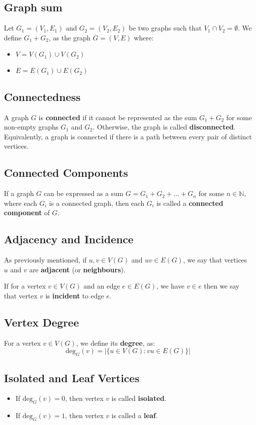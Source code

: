 \documentclass[docmute]{article}
\begin{document}
\subsection*{Graph sum}
Let \(G_1 = (V_1, E_1)\) and \(G_2 = (V_2, E_2)\) be two graphs such that  \(V_1 \cap V_2 = \emptyset\). We define \(G_1 + G_2\), as the graph \(G = (V,E)\) where:
\begin{itemize}
    \item \(V = V(G_1) \cup V(G_2)\)
    \item \(E = E(G_1) \cup E(G_2)\)
\end{itemize}

\subsection*{Connectedness}
A graph \(G\) is \textbf{connected} if it cannot be represented as the sum \(G_1 + G_2\) for some non-empty graphs \(G_1\) and \(G_2\). Otherwise, the graph is called \textbf{disconnected}.
Equivalently, a graph is connected if there is a path between every pair of distinct vertices.

\subsection*{Connected Components}
If a graph \(G\) can be expressed as a sum \(G = G_1 + G_2 + \dots + G_n\) for some \(n \in \mathbb{N}\), where each \(G_i\) is a connected graph, then each \(G_i\) is called a \textbf{connected component} of \(G\).

\subsection*{Adjacency and Incidence}
As previously mentioned, if \(u,v \in V(G)\) and \(uv \in E(G)\), we say that vertices \(u\) and \(v\) are \textbf{adjacent} (or \textbf{neighbours}).

If for a vertex \(v \in V(G)\) and an edge \(e \in E(G)\), we have \(v \in e\) then we say that vertex \(v\) is \textbf{incident} to edge \(e\).

\subsection*{Vertex Degree}
For a vertex \(v \in V(G)\), we define its \textbf{degree}, as:
\[ \text{deg}_G(v) = |\{u \in V(G) : vu \in E(G)\}| \]

\subsection*{Isolated and Leaf Vertices}
\begin{itemize}
    \item  If \(\text{deg}_G(v) = 0\), then vertex \(v\) is called \textbf{isolated}.
    \item If \(\text{deg}_G(v) = 1\), then vertex \(v\) is called a \textbf{leaf}.
\end{itemize}
\end{document}
